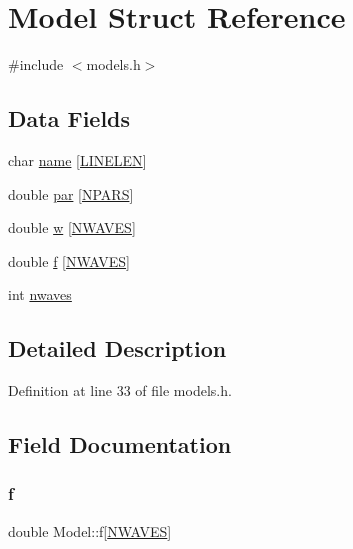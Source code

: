 \hypertarget{struct_model}{}\section{Model Struct Reference}
\label{struct_model}


{\ttfamily \#include $<$models.\+h$>$}

\subsection*{Data Fields}
\begin{DoxyCompactItemize}
\item 
char \hyperlink{struct_model_ae1a912821e971507d741235b3ed9a53b}{name} \mbox{[}\hyperlink{wind__updates2d_8c_a764eaf37b6117ac7a17b1c049c1d2d16}{L\+I\+N\+E\+L\+EN}\mbox{]}
\item 
double \hyperlink{struct_model_a4965d57176e865b9327da14bdc2fe1d4}{par} \mbox{[}\hyperlink{models_8h_a4a80e098a43386a893ebc656b14e636c}{N\+P\+A\+RS}\mbox{]}
\item 
double \hyperlink{struct_model_aaba6c185c8096c923ffdbb3dcfdc3864}{w} \mbox{[}\hyperlink{models_8h_a95cbba9bb03693d847a93cffbbf015e4}{N\+W\+A\+V\+ES}\mbox{]}
\item 
double \hyperlink{struct_model_a2fb891a6efa823f3a909dbd5ebb57af1}{f} \mbox{[}\hyperlink{models_8h_a95cbba9bb03693d847a93cffbbf015e4}{N\+W\+A\+V\+ES}\mbox{]}
\item 
int \hyperlink{struct_model_a1342a65367462309cd78b4e8501676d5}{nwaves}
\end{DoxyCompactItemize}


\subsection{Detailed Description}


Definition at line 33 of file models.\+h.



\subsection{Field Documentation}
\mbox{\label{struct_model_a2fb891a6efa823f3a909dbd5ebb57af1}} 
\subsubsection{\texorpdfstring{f}{f}}
{\footnotesize\ttfamily double Model\+::f\mbox{[}\hyperlink{models_8h_a95cbba9bb03693d847a93cffbbf015e4}{N\+W\+A\+V\+ES}\mbox{]}}



